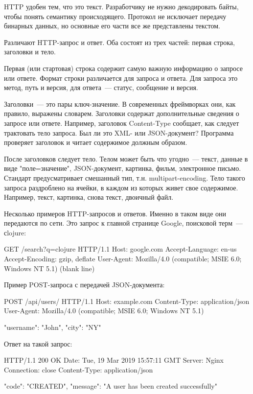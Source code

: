 HTTP удобен тем, что это текст. Разработчику не нужно декодировать байты, чтобы
понять семантику происходящего. Протокол не исключает передачу бинарных данных,
но основные его части все же представлены текстом.

Различают HTTP-запрос и ответ. Оба состоят из трех частей: первая строка,
заголовки и тело.

Первая (или стартовая) строка содержит самую важную информацию о запросе или
ответе. Формат строки различается для запроса и ответа. Для запроса это метод,
путь и версия, для ответа~--- статус, сообщение и версия.

Заголовки~--- это пары ключ-значение. В современных фреймворках они, как правило,
выражены словарем. Заголовки содержат дополнительные сведения о запросе или
ответе. Например, заголовок Content-Type сообщает, как следует трактовать тело
запроса. Был ли это XML- или JSON-документ? Программа проверяет заголовок и
читает содержимое должным образом.

После заголовков следует тело. Телом может быть что угодно~--- текст, данные в
виде "поле=значение", JSON-документ, картинка, фильм, электронное
письмо. Стандарт предусматривает смешанный тип, т.н. multipart-encoding. Тело
такого запроса раздроблено на ячейки, в каждом из которых живет свое
содержимое. Например, текст, картинка, снова текст, двоичный файл.

Несколько примеров HTTP-запросов и ответов. Именно в таком виде они передаются
по сети. Это запрос к главной странице Google, поисковой терм~--- сlojure:

\begin{code}
GET /search?q=clojure HTTP/1.1
Host: google.com
Accept-Language: en-us
Accept-Encoding: gzip, deflate
User-Agent: Mozilla/4.0 (compatible; MSIE 6.0; Windows NT 5.1)
(blank line)
\end{code}

Пример POST-запроса с передачей JSON-документа:

\begin{code}
POST /api/users/ HTTP/1.1
Host: example.com
Content-Type: application/json
User-Agent: Mozilla/4.0 (compatible; MSIE 6.0; Windows NT 5.1)

{
  "username": "John",
  "city": "NY"
}
\end{code}

Ответ на такой запрос:

\begin{code}
HTTP/1.1 200 OK
Date: Tue, 19 Mar 2019 15:57:11 GMT
Server: Nginx
Connection: close
Content-Type: application/json

{
  "code": "CREATED",
  "message": "A user has been created successfully"
}
\end{code}

